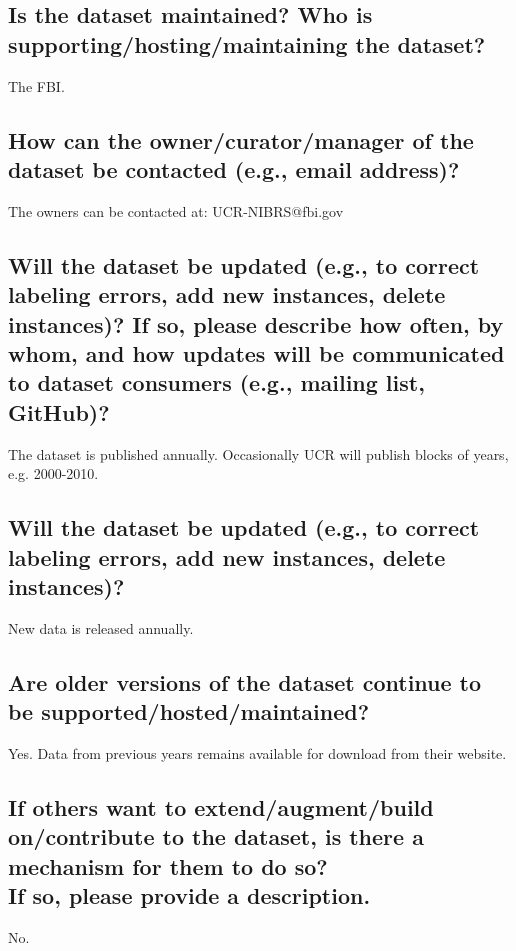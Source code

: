 \documentclass[letterpaper, 10 pt, conference]{ieeeconf}  %
\newcommand{\subtitle}[1]{{\\ \small \normalfont \color{purple} #1}}
\begin{document}
\subsection{Is the dataset maintained? Who is supporting/hosting/maintaining the dataset?}

The FBI.

\subsection{How can the owner/curator/manager of the dataset be contacted (e.g., email address)?}

The owners can be contacted at: UCR-NIBRS@fbi.gov

\subsection{Will the dataset be updated (e.g., to correct labeling errors, add new instances, delete instances)? If so, please describe how often, by whom, and how updates will be communicated to dataset consumers (e.g., mailing list, GitHub)?}

The dataset is published annually. Occasionally UCR will publish blocks of years, e.g. 2000-2010.

\subsection{Will the dataset be updated (e.g., to correct labeling errors, add new instances, delete instances)?}

New data is released annually. 


\subsection{Are older versions of the dataset continue to be supported/hosted/maintained?}

Yes. Data from previous years remains available for download from their website.

\subsection{If others want to extend/augment/build on/contribute to the dataset, is there a mechanism for them to do so? \subtitle{If so, please provide a description.}}

No.

\medskip
 
  

\end{document}
